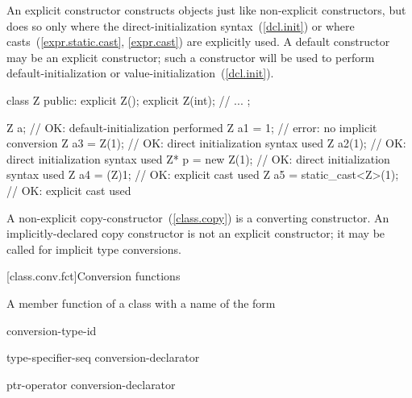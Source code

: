 \pnum
An explicit constructor constructs objects just like non-explicit
constructors, but does so only where the direct-initialization syntax~(\ref{dcl.init}) or where casts~(\ref{expr.static.cast}, \ref{expr.cast}) are explicitly
used.
A default constructor may be an explicit constructor; such a constructor
will be used to perform default-initialization
or value-initialization~(\ref{dcl.init}).
\enterexample

\begin{codeblock}
class Z {
public:
	explicit Z();
	explicit Z(int);
	// ...
};

Z a;                            // OK: default-initialization performed
Z a1 = 1;                       // error: no implicit conversion
Z a3 = Z(1);                    // OK: direct initialization syntax used
Z a2(1);                        // OK: direct initialization syntax used
Z* p = new Z(1);                // OK: direct initialization syntax used
Z a4 = (Z)1;                    // OK: explicit cast used
Z a5 = static_cast<Z>(1);       // OK: explicit cast used
\end{codeblock}
\exitexampleb

\pnum
A
non-explicit
copy-constructor~(\ref{class.copy}) is a converting constructor.
An implicitly-declared copy constructor is not an explicit constructor;
it may be called for implicit type conversions.

[class.conv.fct]{Conversion functions}%
%
%
%

\pnum
A member function of a class  with a name of the form

\begin{bnf}
\br
     conversion-type-id
\end{bnf}

\begin{bnf}
\br
    type-specifier-seq conversion-declarator\opt
\end{bnf}

\begin{bnf}
\br
    ptr-operator conversion-declarator\opt
\end{bnf}

